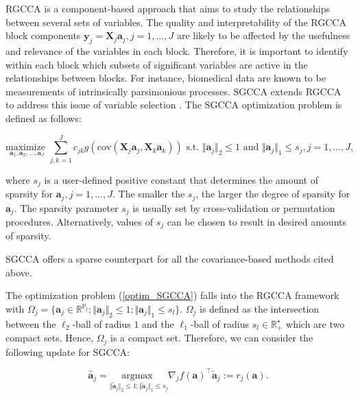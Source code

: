 \documentclass[
]{jss}
\begin{document}
RGCCA is a component-based approach that aims to study the relationships
between several sets of variables. The quality and interpretability of
the RGCCA block components
\(\mathbf{y}_j= \mathbf{X}_j \mathbf{a}_j,j=1, \ldots,J\) are likely to
be affected by the usefulness and relevance of the variables in each
block. Therefore, it is important to identify within each block which
subsets of significant variables are active in the relationships between
blocks. For instance, biomedical data are known to be measurements of
intrinsically parsimonious processes. SGCCA extends RGCCA to address
this issue of variable selection \citep{Tenenhaus2014b}. The SGCCA
optimization problem is defined as follows:

\begin{equation}
\displaystyle \underset{\mathbf{a}_1,\mathbf{a}_2, \ldots,\mathbf{a}_J}{\text{maximize }} \sum_{j, k = 1}^J c_{jk}g(\mathrm{cov}(\mathbf{X}_j\mathbf{a}_j, \mathbf{X}_k\mathbf{a}_k)) \text{ s.t. } \Vert \mathbf{a}_j \Vert_2 \le 1 \text{ and } \Vert \mathbf{a}_j \Vert_1 \le s_j, j=1,\ldots,J,
\label{optim_SGCCA}
\end{equation}

where \(s_j\) is a user-defined positive constant that determines the
amount of sparsity for \(\mathbf{a}_j, j=1, \ldots,J\). The smaller the
\(s_j\), the larger the degree of sparsity for \(\mathbf{a}_j\). The
sparsity parameter \(s_j\) is usually set by cross-validation or
permutation procedures. Alternatively, values of \(s_j\) can be chosen
to result in desired amounts of sparsity.

SGCCA offers a sparse counterpart for all the covariance-based methods
cited above.

The optimization problem (\ref{optim_SGCCA}) falls into the RGCCA
framework with
\(\Omega_j = \lbrace \mathbf a_j\in\mathbb{R}^{p_j}; \Vert \mathbf a_j \Vert_2 \leq 1; \Vert \mathbf a_j \Vert_1 \leq s_l\rbrace\).
\(\Omega_j\) is defined as the intersection between the \(\ell_2\)-ball
of radius \(1\) and the \(\ell_1\)-ball of radius
\(s_l \in \mathbb{R}_+^\star\) which are two compact sets. Hence,
\(\Omega_j\) is a compact set. Therefore, we can consider the following
update for SGCCA:

\begin{equation}
    \hat{ \mathbf a}_j = \underset{\Vert \tilde{ \mathbf a}_j \Vert_2 \leq 1 ; \Vert \tilde{ \mathbf a}_j \Vert_1 \leq s_j}{\text{argmax }} \nabla_j f( \mathbf a)^\top \tilde{ \mathbf a}_j := r_j( \mathbf a).
\label{update_SGCCA}
\end{equation}
\end{document}

